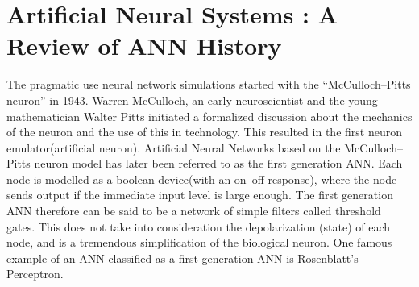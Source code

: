 





\section{Artificial Neural Systems : A Review of ANN History}
	\label{ssecHistoryOfANN}
	The pragmatic use neural network simulations started with the ``McCulloch--Pitts neuron'' in 1943.
	Warren McCulloch, an early neuroscientist and the young mathematician Walter Pitts initiated a formalized discussion about the mechanics of the neuron and the use of this in technology. %
	This resulted in the first neuron emulator(artificial neuron). %
%
	Artificial Neural Networks based on the McCulloch--Pitts neuron model has later been referred to as the first generation ANN\cite{Maass97networksof}.
	Each node is modelled as a boolean device(with an on--off response), where the node sends output if the immediate input level is large enough.
	The first generation ANN therefore can be said to be a network of simple filters called threshold gates.
	This does not take into consideration the depolarization (state) of each node, and is a tremendous simplification of the biological neuron.
	One famous example of an ANN classified as a first generation ANN is Rosenblatt's Perceptron\cite{HaykinANNbok}.


